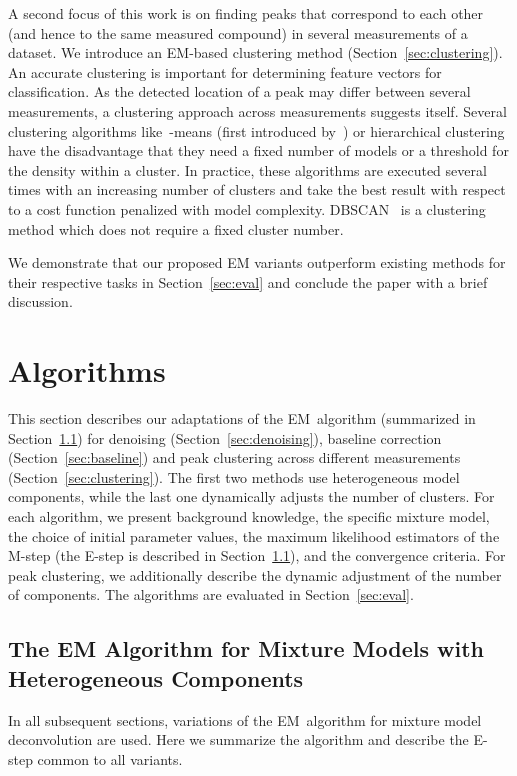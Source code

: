 \documentclass{article}
\begin{document}
A second focus of this work is on finding peaks that correspond to each other (and hence to the same measured compound) in several measurements of a dataset.
We introduce an EM-based clustering method (Section~\ref{sec:clustering}).
An accurate clustering is important for determining feature vectors for classification.
As the detected location of a peak may differ between several measurements, a clustering approach across measurements suggests itself.
Several clustering algorithms like~-means (first introduced by~\cite{macqueen1967kmeans}) or hierarchical clustering have the disadvantage that they need a fixed number of models or a threshold for the density within a cluster.
In practice, these algorithms are executed several times with an increasing number of clusters and take the best result with respect to a cost function penalized with model complexity.
DBSCAN~\citep{ester/etal/1996} is a clustering method which does not require a fixed cluster number.

We demonstrate that our proposed EM variants outperform existing methods for their respective tasks in Section~\ref{sec:eval} and conclude the paper with a brief discussion.
\section{Algorithms}
\label{sec:algo}

This section describes our adaptations of the EM~algorithm (summarized in Section~\ref{sec:algo:em}) for denoising (Section~\ref{sec:denoising}), baseline correction (Section~\ref{sec:baseline}) and peak clustering across different measurements (Section~\ref{sec:clustering}).
The first two methods use heterogeneous model components, while the last one dynamically adjusts the number of clusters.
For each algorithm, we present background knowledge, the specific mixture model, the choice of initial parameter values, the maximum likelihood estimators of the M-step (the E-step is described in Section~\ref{sec:algo:em}), and the convergence criteria.
For peak clustering, we additionally describe the dynamic adjustment of the number of components.
The algorithms are evaluated in Section~\ref{sec:eval}.

\subsection{The EM Algorithm for Mixture Models with Heterogeneous Components}
\label{sec:algo:em}

In all subsequent sections, variations of the EM~algorithm \citep{Dempster/etal/1977a} for mixture model deconvolution are used.
Here we summarize the algorithm and describe the E-step common to all variants.
\end{document}
